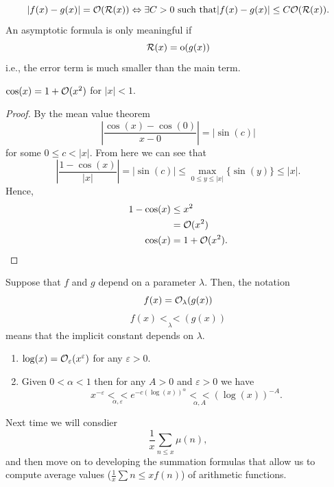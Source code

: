 \documentclass[twoside, openright, fontsize=10pt, headings=big]{scrbook}
\begin{document}
\[
    |f(x)-g(x)|=\mathcal{O}(\mathcal{R}(x))\Leftrightarrow \exists C>0 \text{ such that} |f(x)-g(x)|\leq C\mathcal{O}(\mathcal{R}(x)).
\]
An asymptotic formula is only meaningful if 
\[
    \mathcal{R}(x)=\text{o}(g(x))
\]
i.e., the error term is much smaller than the main term.
\begin{example}{}{}
    $\cos(x)=1+\mathcal{O}(x^2)$ for $|x|<1$.
\end{example}
\begin{proof}
    By the mean value theorem
    \[
    \left|\frac{\cos(x)-\cos(0)}{x-0}\right|=|\sin(c)|
    \]
    for some $0\leq c<|x|$. From here we can see that
    \[
    \left|\frac{1-\cos(x)}{|x|}\right|=|\sin(c)|\leq \max_{0\leq y\leq |x|}\{\sin(y)\}\leq |x|.
    \]
    Hence, 
    \begin{align*}
        1-\cos(x)&\leq x^2\\
        &=\mathcal{O}(x^2)\\
        \cos(x)&=1+\mathcal{O}(x^2).\qedhere 
    \end{align*}
\end{proof}
Suppose that $f$ and $g$ depend on a parameter $\lambda$. Then, the notation 
\[
    f(x)=\mathcal{O}_{\lambda}(g(x))
\]
\[
    f(x)\underset{\lambda}{<<}(g(x))
\]
means that the implicit constant depends on $\lambda$.
\begin{example}{}{}
\begin{enumerate}
    \item $\log(x)=\mathcal{O}_\varepsilon(x^\varepsilon)$ for any $\varepsilon>0$.
    \item Given $0<\alpha<1$ then for any $A>0$ and $\varepsilon>0$ we have
    \[
        x^{-\varepsilon}\underset{\alpha,\varepsilon}{<<}e^{-c(\log(x))^\alpha}\underset{\alpha,A}{<<} (\log(x))^{-A}.
    \]
\end{enumerate}
\end{example}
Next time we will consdier 
\[
    \frac{1}{x}\sum_{n\leq x}\mu(n),
\]
and then move on to developing the summation formulas that allow us to compute average values ($\frac{1}{x}\sum{n\leq x}f(n)$) of arithmetic functions.
\end{document}
